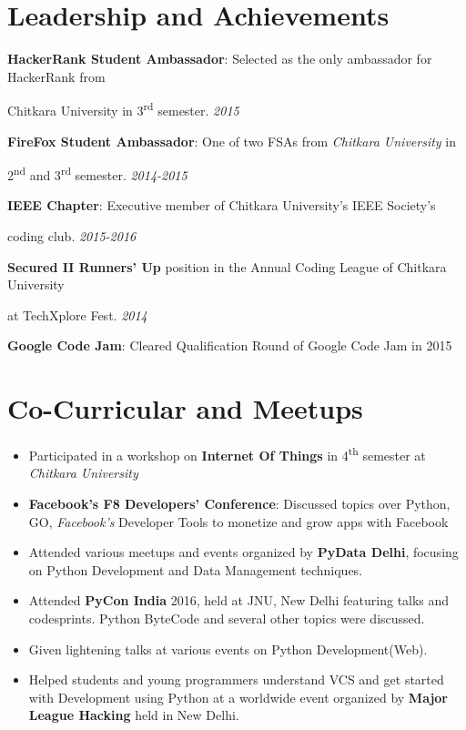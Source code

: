 \documentclass{ss_resume}
\begin{document}
\section{Leadership and Achievements}

\textbf{HackerRank Student Ambassador}: Selected as the only ambassador for HackerRank from

Chitkara University in 3\textsuperscript{rd} semester. \hfill \textit{2015}

\medskip

\textbf{FireFox Student Ambassador}: One of two FSAs from \textit{Chitkara University} in

2\textsuperscript{nd} and 3\textsuperscript{rd} semester. \hfill \textit{2014-2015}

\medskip

\textbf{IEEE Chapter}: Executive member of Chitkara University's IEEE Society's

coding club. \hfill \textit{2015-2016}

\medskip

\textbf{Secured II Runners' Up} position in the Annual Coding League of Chitkara University

at TechXplore Fest. \hfill \textit{2014}

\medskip

\textbf{Google Code Jam}: Cleared Qualification Round of Google Code Jam in 2015


\section{Co-Curricular and Meetups}

\begin{itemize}
    \item Participated in a workshop on \textbf{Internet Of Things} in 4\textsuperscript{th} semester at \textit{Chitkara University}
    \item{\textbf{Facebook's F8 Developers' Conference}: Discussed topics over Python, GO, \textit{Facebook's} Developer Tools to monetize and grow apps with Facebook}
    \item Attended various meetups and events organized by \textbf{PyData Delhi}, focusing on Python Development and Data Management techniques.
    \item Attended \textbf{PyCon India} 2016, held at JNU, New Delhi featuring talks and codesprints. Python ByteCode and several other topics were discussed.
    \item Given lightening talks at various events on Python Development(Web).
    \item Helped students and young programmers understand VCS and get started with Development using Python at a worldwide event organized by \textbf{Major League Hacking} held in New Delhi.
\end{itemize}
\end{document}
